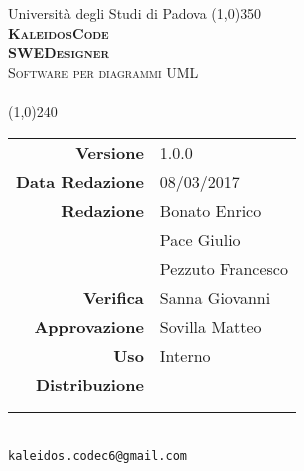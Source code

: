 \documentclass[a4paper,12pt]{article}
\author{KaleidosCode}
\date{08/03/2017}	%
\begin{document}
	\begin{titlepage}
		\centering Università degli Studi di Padova
		\line(1,0){350}\\
		\vspace{0.4cm}
		{\bfseries\scshape\LARGE KaleidosCode\\}
		\vspace{0.4cm}
		{\bfseries\scshape\LARGE SWEDesigner\\}
		{\scshape\Large Software per diagrammi UML\\}
		\vspace{1cm}
		{\scshape\Large \studiodifattibilitai\ \\}		%
		\vspace{1.4cm}
		\logo
		\vspace{1.2cm}
		\line(1,0){240}\\
		\begin{tabular}{r|l}
			{\hfill \textbf{Versione}} 			& 1.0.0\\
			{\hfill \textbf{Data Redazione}} 	& 08/03/2017\\	%
			{\hfill \textbf{Redazione}} 		& Bonato Enrico\\ & Pace Giulio\\ & Pezzuto Francesco\\
			{\hfill \textbf{Verifica}} 			& Sanna Giovanni\\
			{\hfill \textbf{Approvazione}} 		& Sovilla Matteo\\
			{\hfill \textbf{Uso}} 				& Interno\\
			{\hfill \textbf{Distribuzione}} 	& \vardanega \\ & \cardin \\ & \proponente\\
		\end{tabular}\\
		\vspace{2cm}
		\texttt{kaleidos.codec6@gmail.com}
	\end{titlepage}

	\pagestyle{myfront}
	\newpage
		
	\newpage
		\tableofcontents
	\pagestyle{mymain}
	\newpage
		
	\newpage
		
	\newpage
		
	\newpage
		
	\newpage
		
	\newpage
		
	\newpage
		

	\label{LastPage}
\end{document}
